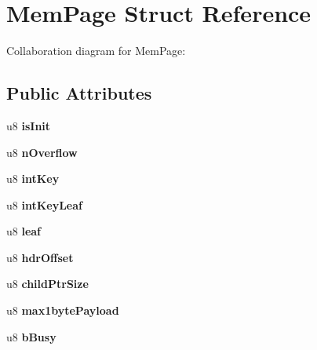 \hypertarget{structMemPage}{}\section{Mem\+Page Struct Reference}
\label{structMemPage}


Collaboration diagram for Mem\+Page\+:
\subsection*{Public Attributes}
\begin{DoxyCompactItemize}
\item 
u8 {\bfseries is\+Init}\hypertarget{structMemPage_a3ab4ace46245be0fb2fb19eaa2862019}{}\label{structMemPage_a3ab4ace46245be0fb2fb19eaa2862019}

\item 
u8 {\bfseries n\+Overflow}\hypertarget{structMemPage_a3f7fa1a1eba3af840ef887e8ddd6d2cc}{}\label{structMemPage_a3f7fa1a1eba3af840ef887e8ddd6d2cc}

\item 
u8 {\bfseries int\+Key}\hypertarget{structMemPage_a46784c3c4708c7a582cff81a29c55323}{}\label{structMemPage_a46784c3c4708c7a582cff81a29c55323}

\item 
u8 {\bfseries int\+Key\+Leaf}\hypertarget{structMemPage_a7c30c56237c38e0b81842ae2a6bae9d7}{}\label{structMemPage_a7c30c56237c38e0b81842ae2a6bae9d7}

\item 
u8 {\bfseries leaf}\hypertarget{structMemPage_af18504bd0a2e7d39d9b485d434af0447}{}\label{structMemPage_af18504bd0a2e7d39d9b485d434af0447}

\item 
u8 {\bfseries hdr\+Offset}\hypertarget{structMemPage_a01967a1a593980fb71c8ccf3393ae156}{}\label{structMemPage_a01967a1a593980fb71c8ccf3393ae156}

\item 
u8 {\bfseries child\+Ptr\+Size}\hypertarget{structMemPage_aeba10281fc255d9bbc0e31486f8fbd48}{}\label{structMemPage_aeba10281fc255d9bbc0e31486f8fbd48}

\item 
u8 {\bfseries max1byte\+Payload}\hypertarget{structMemPage_a79548547cafb0e6d8549006bdc553f0a}{}\label{structMemPage_a79548547cafb0e6d8549006bdc553f0a}

\item 
u8 {\bfseries b\+Busy}\hypertarget{structMemPage_a0b7935a6fdec1d6d31c4b3952b0461ea}{}\label{structMemPage_a0b7935a6fdec1d6d31c4b3952b0461ea}


\end{DoxyCompactItemize}
